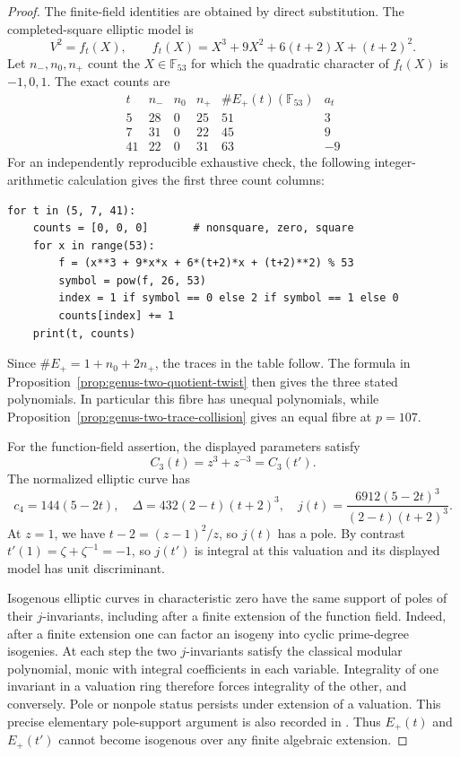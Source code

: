 \documentclass[11pt]{article}
\theoremstyle{definition}
\theoremstyle{remark}
\begin{document}
\begin{proof}
The finite-field identities are obtained by direct substitution.
The completed-square elliptic model is
\[
 V^2=f_t(X),\qquad
 f_t(X)=X^3+9X^2+6(t+2)X+(t+2)^2.
\]
Let \(n_-,n_0,n_+\) count the \(X\in\mathbb F_{53}\) for which
the quadratic character of \(f_t(X)\) is \(-1,0,1\).
The exact counts are
\[
\begin{array}{c|rrr|r|r}
 t&n_-&n_0&n_+&\#E_+(t)(\mathbb F_{53})&a_t\\ \hline
 5 &28&0&25&51&3\\
 7 &31&0&22&45&9\\
 41&22&0&31&63&-9
\end{array}
\]
For an independently reproducible exhaustive check, the following
integer-arithmetic calculation gives the first three count columns:
\begin{verbatim}
for t in (5, 7, 41):
    counts = [0, 0, 0]       # nonsquare, zero, square
    for x in range(53):
        f = (x**3 + 9*x*x + 6*(t+2)*x + (t+2)**2) % 53
        symbol = pow(f, 26, 53)
        index = 1 if symbol == 0 else 2 if symbol == 1 else 0
        counts[index] += 1
    print(t, counts)
\end{verbatim}
Since \(\#E_+=1+n_0+2n_+\), the traces in the table follow.
The formula in Proposition~\ref{prop:genus-two-quotient-twist}
then gives the three stated polynomials. In particular this fibre
has unequal polynomials, while
Proposition~\ref{prop:genus-two-trace-collision} gives an equal
fibre at \(p=107\).

For the function-field assertion, the displayed parameters satisfy
\[
 C_3(t)=z^3+z^{-3}=C_3(t').
\]
The normalized elliptic curve has
\[
 c_4=144(5-2t),\quad
 \Delta=432(2-t)(t+2)^3,\quad
 j(t)=\frac{6912(5-2t)^3}{(2-t)(t+2)^3}.
\]
At \(z=1\), we have \(t-2=(z-1)^2/z\), so \(j(t)\) has a pole.
By contrast \(t'(1)=\zeta+\zeta^{-1}=-1\), so \(j(t')\) is
integral at this valuation and its displayed model has unit
discriminant.

Isogenous elliptic curves in characteristic zero have the same
support of poles of their \(j\)-invariants, including after a finite
extension of the function field. Indeed, after a finite extension
one can factor an isogeny into cyclic prime-degree isogenies. At each
step the two \(j\)-invariants satisfy the classical modular
polynomial, monic with integral coefficients in each variable.
Integrality of one invariant in a valuation ring therefore forces
integrality of the other, and conversely. Pole or nonpole status
persists under extension of a valuation. This precise elementary
pole-support argument is also recorded in
\citet[Remark~5.5, author V2 p.~13]{GriffonPazuki2022}.
Thus \(E_+(t)\) and \(E_+(t')\) cannot become isogenous over any
finite algebraic extension.


\end{proof}
\end{document}
